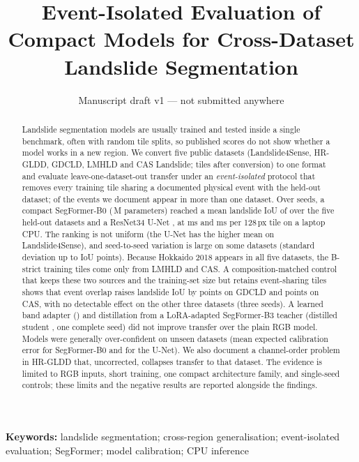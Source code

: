 \documentclass[11pt]{article}
\title{\textbf{Event-Isolated Evaluation of Compact Models for Cross-Dataset Landslide Segmentation}}
\author{\todo{Author names and affiliations to be completed by the authors}}
\date{Manuscript draft v1 --- not submitted anywhere}
\newcommand{\iou}{IoU}
\begin{document}
\maketitle

\begin{abstract}
Landslide segmentation models are usually trained and tested inside a single benchmark, often with random tile splits, so published scores do not show whether a model works in a new region.
We convert five public datasets (Landslide4Sense, HR-GLDD, GDCLD, LMHLD and CAS Landslide; \TilesAll{} tiles after conversion) to one format and evaluate leave-one-dataset-out transfer under an \emph{event-isolated} protocol that removes every training tile sharing a documented physical event with the held-out dataset; \EvTwoPlus{} of the \EvTotal{} events we document appear in more than one dataset.
Over \NumSeeds{} seeds, a compact SegFormer-B0 (\SegParamsM{}\,M parameters) reached a mean landslide \iou{} of \SegIouAllP{} over the five held-out datasets and a ResNet34 U-Net \UnetIouAllP{}, at \LatSegPxOneTwoEightTFour{} ms and \LatUnetPxOneTwoEightTFour{} ms per 128\,px tile on a laptop CPU. The ranking is not uniform (the U-Net has the higher mean on Landslide4Sense), and seed-to-seed variation is large on some datasets (standard deviation up to \SegIouLfsS{} \iou{} points).
Because Hokkaido 2018 appears in all five datasets, the B-strict training tiles come only from LMHLD and CAS. A composition-matched control that keeps these two sources and the training-set size but retains event-sharing tiles shows that event overlap raises landslide \iou{} by \OvlEventsSeedsAbsGdc{} points on GDCLD and \OvlEventsSeedsAbsCas{} points on CAS, with no detectable effect on the other three datasets (three seeds).
A learned band adapter (\AdpIouAllP{}) and distillation from a LoRA-adapted SegFormer-B3 teacher (distilled student \KdIouAllZ{}, one complete seed) did not improve transfer over the plain RGB model. Models were generally over-confident on unseen datasets (mean expected calibration error \SegEceAllP{} for SegFormer-B0 and \UnetEceAllP{} for the U-Net).
We also document a channel-order problem in HR-GLDD that, uncorrected, collapses transfer to that dataset.
The evidence is limited to RGB inputs, short training, one compact architecture family, and single-seed controls; these limits and the negative results are reported alongside the findings.
\end{abstract}

\noindent\textbf{Keywords:} landslide segmentation; cross-region generalisation; event-isolated evaluation; SegFormer; model calibration; CPU inference
\end{document}
